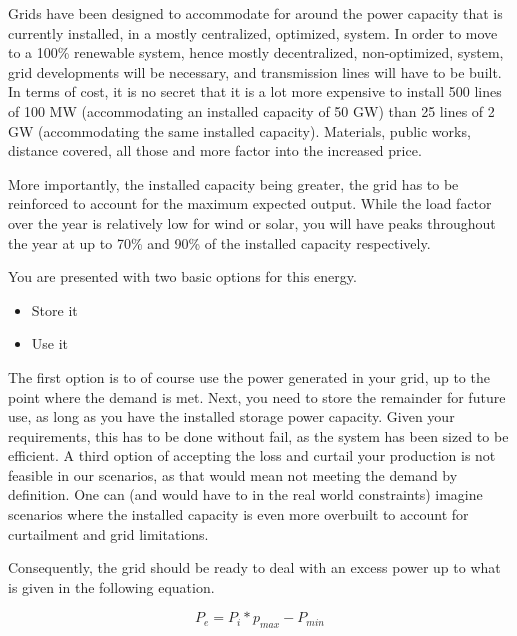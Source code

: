 Grids have been designed to accommodate for around the power capacity that is currently installed, in a mostly centralized, optimized, system. In order to move to a 100\% renewable system, hence mostly decentralized, non-optimized, system, grid developments will be necessary, and transmission lines will have to be built. In terms of cost, it is no secret that it is a lot more expensive to install 500 lines of 100 MW (accommodating an installed capacity of 50 GW) than 25 lines of 2 GW (accommodating the same installed capacity). Materials, public works, distance covered, all those and more factor into the increased price.

More importantly, the installed capacity being greater, the grid has to be reinforced to account for the maximum expected output. While the load factor over the year is relatively low for wind or solar, you will have peaks throughout the year at up to 70\% and 90\% of the installed capacity respectively. 

You are presented with two basic options for this energy.
\begin{itemize}
\item Store it
\item Use it
\end{itemize}

The first option is to of course use the power generated in your grid, up to the point where the demand is met. Next, you need to store the remainder for future use, as long as you have the installed storage power capacity. Given your requirements, this has to be done without fail, as the system has been sized to be efficient. A third option of accepting the loss and curtail your production is not feasible in our scenarios, as that would mean not meeting the demand by definition. One can (and would have to in the real world constraints) imagine scenarios where the installed capacity is even more overbuilt to account for curtailment and grid limitations.


\begin{remark}
Consequently, the grid should be ready to deal with an excess power up to what is given in the following equation.

\begin{equation}\label{excess_power}
P_e = P_i * p_{max} - P_{min}
\end{equation}
\end{remark}


